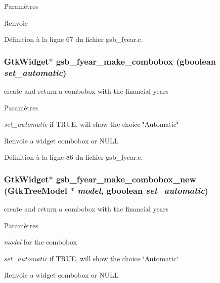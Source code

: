 \begin{DoxyParams}{Paramètres}
\item[{\em }]\end{DoxyParams}
\begin{DoxyReturn}{Renvoie}

\end{DoxyReturn}


Définition à la ligne 67 du fichier gsb\_\-fyear.c.

\subsubsection[{gsb\_\-fyear\_\-make\_\-combobox}]{\setlength{\rightskip}{0pt plus 5cm}GtkWidget$\ast$ gsb\_\-fyear\_\-make\_\-combobox (gboolean {\em set\_\-automatic})}\label{gsb__fyear_8h_a6f8ef344dde2ca4102a8371319b7565e}
create and return a combobox with the financial years


\begin{DoxyParams}{Paramètres}
\item[{\em set\_\-automatic}]if TRUE, will show the choice \char`\"{}Automatic\char`\"{}\end{DoxyParams}
\begin{DoxyReturn}{Renvoie}
a widget combobox or NULL 
\end{DoxyReturn}


Définition à la ligne 86 du fichier gsb\_\-fyear.c.

\subsubsection[{gsb\_\-fyear\_\-make\_\-combobox\_\-new}]{\setlength{\rightskip}{0pt plus 5cm}GtkWidget$\ast$ gsb\_\-fyear\_\-make\_\-combobox\_\-new (GtkTreeModel $\ast$ {\em model}, \/  gboolean {\em set\_\-automatic})}\label{gsb__fyear_8h_af7e2bd1df0eccd82fa4fa78f269ae5d0}
create and return a combobox with the financial years


\begin{DoxyParams}{Paramètres}
\item[{\em model}]for the combobox \item[{\em set\_\-automatic}]if TRUE, will show the choice \char`\"{}Automatic\char`\"{}\end{DoxyParams}
\begin{DoxyReturn}{Renvoie}
a widget combobox or NULL 
\end{DoxyReturn}


